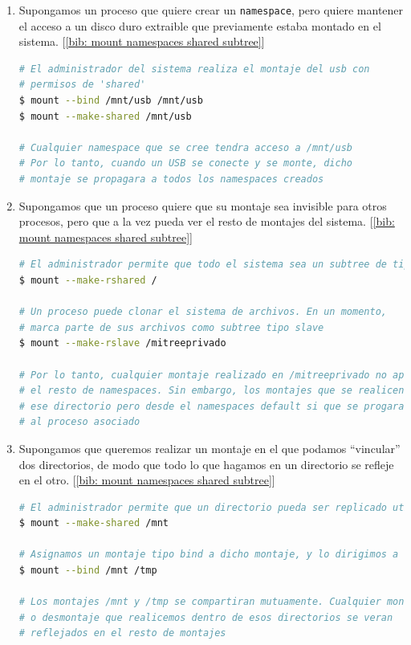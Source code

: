 \documentclass[12pt]{article}
\begin{document}
	\begin{enumerate}
		\item Supongamos un proceso que quiere crear un \texttt{namespace}, pero quiere mantener el acceso a un disco duro extraible que previamente estaba montado en el sistema. [\ref{bib: mount namespaces shared subtree}]
		
		\begin{lstlisting}[language=bash, caption={Caso de uso de \texttt{shared subtree}}]
# El administrador del sistema realiza el montaje del usb con 
# permisos de 'shared'
$ mount --bind /mnt/usb /mnt/usb
$ mount --make-shared /mnt/usb
			
# Cualquier namespace que se cree tendra acceso a /mnt/usb
# Por lo tanto, cuando un USB se conecte y se monte, dicho 
# montaje se propagara a todos los namespaces creados
		\end{lstlisting}
	
		\item Supongamos que un proceso quiere que su montaje sea invisible para otros procesos, pero que a la vez pueda ver el resto de montajes del sistema. [\ref{bib: mount namespaces shared subtree}]
		
		\begin{lstlisting}[language=bash, caption={Caso de uso de \texttt{slave mount}}]
# El administrador permite que todo el sistema sea un subtree de tipo shared
$ mount --make-rshared /
			
# Un proceso puede clonar el sistema de archivos. En un momento, 
# marca parte de sus archivos como subtree tipo slave
$ mount --make-rslave /mitreeprivado
			
# Por lo tanto, cualquier montaje realizado en /mitreeprivado no aparecera en 
# el resto de namespaces. Sin embargo, los montajes que se realicen en 
# ese directorio pero desde el namespaces default si que se progaran 
# al proceso asociado
		\end{lstlisting}
	
		\item Supongamos que queremos realizar un montaje en el que podamos ``vincular'' dos directorios, de modo que todo lo que hagamos en un directorio se refleje en el otro. [\ref{bib: mount namespaces shared subtree}]
		
		\begin{lstlisting}[language=bash, caption={Caso de uso de \texttt{bind} y \texttt{shared subtree}}]
# El administrador permite que un directorio pueda ser replicado utilizando el tipo shared
$ mount --make-shared /mnt

# Asignamos un montaje tipo bind a dicho montaje, y lo dirigimos a otro directorio
$ mount --bind /mnt /tmp

# Los montajes /mnt y /tmp se compartiran mutuamente. Cualquier montaje 
# o desmontaje que realicemos dentro de esos directorios se veran
# reflejados en el resto de montajes
		\end{lstlisting}

	\end{enumerate}
\end{document}
